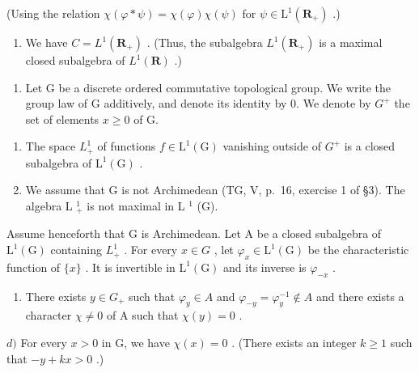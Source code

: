 (Using the relation \(\chi (\varphi *\psi) = \chi (\varphi)\chi (\psi)\) for \(\psi \in \mathrm{L}^1 (\mathbf{R}_+)\) .)

\begin{enumerate}
\def\labelenumi{\alph{enumi})}
\setcounter{enumi}{7}
\tightlist
\item
  We have \(C = L^{1}(\mathbf{R}_{+})\) . (Thus, the subalgebra \(L^{1}(\mathbf{R}_{+})\) is a maximal closed subalgebra of \(L^{1}(\mathbf{R})\) .)
\end{enumerate}

\begin{enumerate}
\def\labelenumi{\arabic{enumi})}
\setcounter{enumi}{17}
\tightlist
\item
  Let G be a discrete ordered commutative topological group. We write the group law of G additively, and denote its identity by 0. We denote by \(G^{+}\) the set of elements \(x \geqslant 0\) of G.
\end{enumerate}

\begin{enumerate}
\def\labelenumi{\alph{enumi})}
\item
  The space \(L_{+}^{1}\) of functions \(f \in \mathrm{L}^{1}(\mathrm{G})\) vanishing outside of \(G^{+}\) is a closed subalgebra of \(\mathrm{L}^{1}(\mathrm{G})\) .
\item
  We assume that G is not Archimedean (TG, V, p.~16, exercise 1 of §3). The algebra L \(_{+}^{1}\) is not maximal in L \(^{1}\) (G).
\end{enumerate}

Assume henceforth that G is Archimedean. Let A be a closed subalgebra of \(\mathrm{L}^{1}(\mathrm{G})\) containing \(L_{+}^{1}\) . For every \(x \in G\) , let \(\varphi_{x} \in \mathrm{L}^{1}(\mathrm{G})\) be the characteristic function of \(\{x\}\) . It is invertible in \(\mathrm{L}^{1}(\mathrm{G})\) and its inverse is \(\varphi_{-x}\) .

\begin{enumerate}
\def\labelenumi{\alph{enumi})}
\setcounter{enumi}{2}
\tightlist
\item
  There exists \(y \in G_{+}\) such that \(\varphi_{y} \in A\) and \(\varphi_{-y} = \varphi_{y}^{-1} \notin A\) and there exists a character \(\chi \neq 0\) of A such that \(\chi(y) = 0\) .
\end{enumerate}

\(d)\) For every \(x > 0\) in G, we have \(\chi(x) = 0\) . (There exists an integer \(k \geqslant 1\) such that \(-y + kx > 0\) .)

